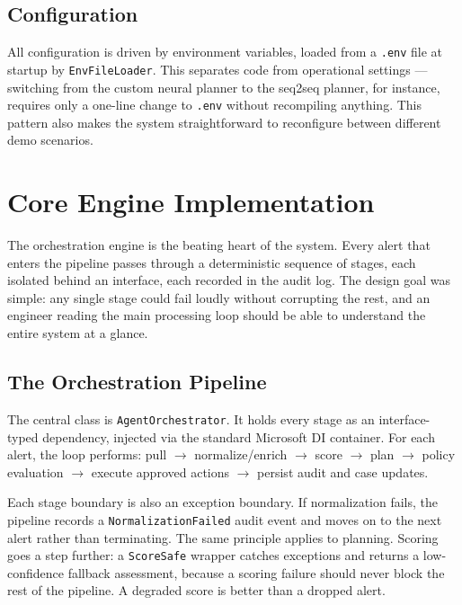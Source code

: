 \subsection{Configuration}

All configuration is driven by environment variables, loaded from a \texttt{.env} file at startup by \texttt{EnvFileLoader}. This separates code from operational settings --- switching from the custom neural planner to the seq2seq planner, for instance, requires only a one-line change to \texttt{.env} without recompiling anything. This pattern also makes the system straightforward to reconfigure between different demo scenarios.

\section{Core Engine Implementation}
\label{sec:impl-core}

The orchestration engine is the beating heart of the system. Every alert that enters the pipeline passes through a deterministic sequence of stages, each isolated behind an interface, each recorded in the audit log. The design goal was simple: any single stage could fail loudly without corrupting the rest, and an engineer reading the main processing loop should be able to understand the entire system at a glance.

\subsection{The Orchestration Pipeline}

The central class is \texttt{AgentOrchestrator}. It holds every stage as an interface-typed dependency, injected via the standard Microsoft DI container. For each alert, the loop performs: pull $\rightarrow$ normalize/enrich $\rightarrow$ score $\rightarrow$ plan $\rightarrow$ policy evaluation $\rightarrow$ execute approved actions $\rightarrow$ persist audit and case updates.

Each stage boundary is also an exception boundary. If normalization fails, the pipeline records a \texttt{NormalizationFailed} audit event and moves on to the next alert rather than terminating. The same principle applies to planning. Scoring goes a step further: a \texttt{ScoreSafe} wrapper catches exceptions and returns a low-confidence fallback assessment, because a scoring failure should never block the rest of the pipeline. A degraded score is better than a dropped alert.

